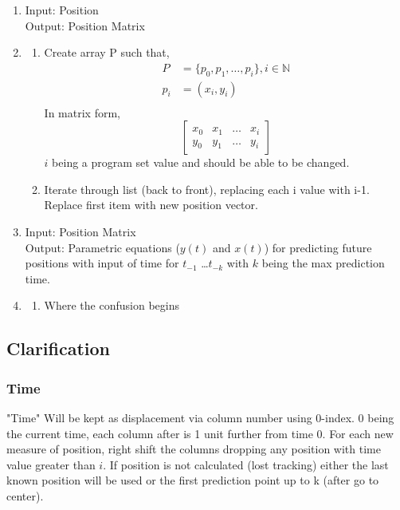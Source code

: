 \documentclass[stu,12pt,floatsintext]{apa7}
\begin{document}
\begin{enumerate}
    \item[\textbf{Step 2}] Input: Position\\
    Output: Position Matrix\\
    \item[]
    \begin{enumerate}
        \item[Step 2.0] Create array P such that,
        \begin{equation*}
            \begin{split}
                P &= \{p_0, p_1, \dots , p_i\}, i \in \mathbb{N}\\
                p_i &= (x_i,y_i)\\
            \end{split}
        \end{equation*}
        In matrix form,
        \begin{equation*}
            \begin{bmatrix}
                x_0 & x_1 & \dots & x_i  \\
                y_0 & y_1 & \dots & y_i
            \end{bmatrix}
        \end{equation*}
        $i$ being a program set value and should be able to be changed.\\
        \item[Step 2.1] Iterate through list (back to front), replacing each i value with i-1. Replace first item with new position vector.\\
    \end{enumerate} 
    \item[\textbf{Step 3}] Input: Position Matrix\\
    Output: Parametric equations ($y(t)$ and $x(t)$) for predicting future positions with input of time for $t_{-1}$ \dots $t_{-k}$ with $k$ being the max prediction time.\\
    \item[]
    \begin{enumerate}
        \item[Step 3.1] Where the confusion begins
    \end{enumerate}
\end{enumerate}

\subsection{Clarification}
\subsubsection{Time}
"Time" Will be kept as displacement via column number using 0-index. 0 being the current time, each column after is 1 unit further from time 0. For each new measure of position, right shift the columns dropping any position with time value greater than $i$. If position is not calculated (lost tracking) either the last known position will be used or the first prediction point up to k (after go to center).\\

\end{document}
